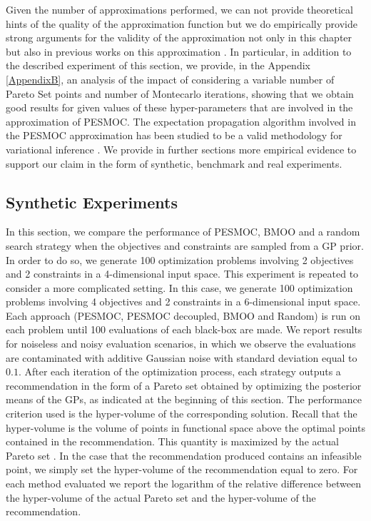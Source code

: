 Given the number of approximations performed, we can not provide theoretical hints of the quality of the approximation function
but we do empirically provide strong arguments for the validity of the approximation not only in this chapter but also in previous works
on this approximation \citep{hernandez2014predictive} \citep{hernandez2015predictive}. In particular, in addition to the described
experiment of this section, we provide, in the Appendix \ref{AppendixB}, an analysis of the impact of considering a variable number of Pareto Set points and number of Montecarlo iterations, showing that we obtain good results for given values of these hyper-parameters that are involved
in the approximation of PESMOC. The expectation propagation algorithm involved in the PESMOC approximation has been studied to be a valid methodology for variational inference \citep{minka2001expectation} \citep{seeger2005expectation}. We provide in further sections more empirical evidence to support our claim in the form of synthetic, benchmark and real experiments.

\subsection{Synthetic Experiments}

In this section, we compare the performance of PESMOC, BMOO and a random search strategy when the objectives and
constraints are sampled from a GP prior. In order to do so, we generate 100 optimization problems involving 2 objectives
and 2 constraints in a 4-dimensional input space. This experiment is repeated to consider a more complicated setting.
In this case, we generate 100 optimization problems involving 4 objectives and 2 constraints in a 6-dimensional input
space.  Each approach (PESMOC, PESMOC decoupled, BMOO and Random) is run on each problem until 100 evaluations of each
black-box are made. We report results for noiseless and noisy evaluation scenarios, in which we observe the evaluations
are contaminated with additive Gaussian noise with standard deviation equal to $0.1$.  After each iteration of the optimization
process, each strategy outputs a recommendation in the form of a Pareto set obtained by optimizing the posterior means of the GPs,
as indicated at the beginning of this section. The performance criterion used is the hyper-volume of the corresponding
solution. Recall that  the hyper-volume is the volume of points in functional space above the optimal points contained
in the recommendation. This quantity is maximized by the actual Pareto set \citep{zitzler1999multiobjective}.
In the case that the recommendation produced contains an infeasible point, we
simply set the hyper-volume of the recommendation equal to zero. For each method evaluated we report the logarithm of
the relative difference between the hyper-volume of the actual Pareto set and the hyper-volume of the recommendation.

